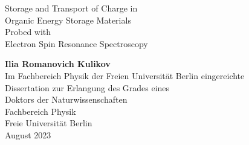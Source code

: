 \documentclass{article}
\begin{document}
\thispagestyle{empty}
\begin{center}
\begin{huge}
Storage and Transport of Charge in\\
Organic Energy Storage Materials\\
Probed with\\
Electron Spin Resonance Spectroscopy\\
\end{huge}
\vspace{10\baselineskip}
\textbf{Ilia Romanovich Kulikov}\\
\vspace{10\baselineskip}
Im Fachbereich Physik der Freien Universität Berlin eingereichte\\
Dissertation zur Erlangung des Grades eines\\
Doktors der Naturwissenschaften\\
\vspace{16\baselineskip}
Fachbereich Physik\\
Freie Universität Berlin\\
August 2023\\
\newpage



\end{center}
\end{document}
